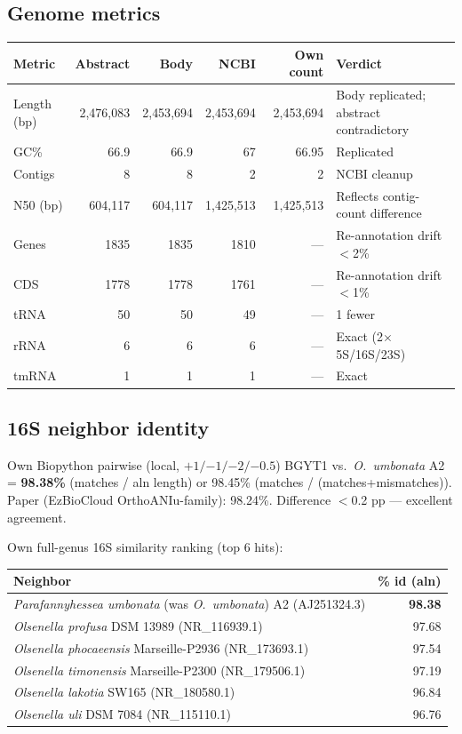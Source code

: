 \documentclass[11pt]{article}
\begin{document}
\subsection{Genome metrics}
\begin{tabular}{@{}lrrrrl@{}}
\toprule
Metric & Abstract & Body & NCBI & Own count & Verdict \\
\midrule
Length (bp) & 2{,}476{,}083 & 2{,}453{,}694 & 2{,}453{,}694 & 2{,}453{,}694 & Body replicated; abstract contradictory \\
GC\% & 66.9 & 66.9 & 67 & 66.95 & Replicated \\
Contigs & 8 & 8 & 2 & 2 & NCBI cleanup \\
N50 (bp) & 604{,}117 & 604{,}117 & 1{,}425{,}513 & 1{,}425{,}513 & Reflects contig-count difference \\
Genes & 1835 & 1835 & 1810 & --- & Re-annotation drift $<$2\% \\
CDS & 1778 & 1778 & 1761 & --- & Re-annotation drift $<$1\% \\
tRNA & 50 & 50 & 49 & --- & 1 fewer \\
rRNA & 6 & 6 & 6 & --- & Exact (2$\times$ 5S/16S/23S) \\
tmRNA & 1 & 1 & 1 & --- & Exact \\
\bottomrule
\end{tabular}

\subsection{16S neighbor identity}
Own Biopython pairwise (local, $+1/{-1}/{-2}/{-0.5}$) BGYT1 vs.\ \emph{O.\ umbonata} A2 = \textbf{98.38\%} (matches / aln length) or 98.45\% (matches / (matches+mismatches)). Paper (EzBioCloud OrthoANIu-family): 98.24\%. Difference $<$0.2 pp --- excellent agreement.

Own full-genus 16S similarity ranking (top 6 hits):

\begin{tabular}{@{}lr@{}}
\toprule
Neighbor & \% id (aln) \\
\midrule
\emph{Parafannyhessea umbonata} (was \emph{O.\ umbonata}) A2 (AJ251324.3) & \textbf{98.38} \\
\emph{Olsenella profusa} DSM 13989 (NR\_116939.1) & 97.68 \\
\emph{Olsenella phocaeensis} Marseille-P2936 (NR\_173693.1) & 97.54 \\
\emph{Olsenella timonensis} Marseille-P2300 (NR\_179506.1) & 97.19 \\
\emph{Olsenella lakotia} SW165 (NR\_180580.1) & 96.84 \\
\emph{Olsenella uli} DSM 7084 (NR\_115110.1) & 96.76 \\
\bottomrule
\end{tabular}
\end{document}
